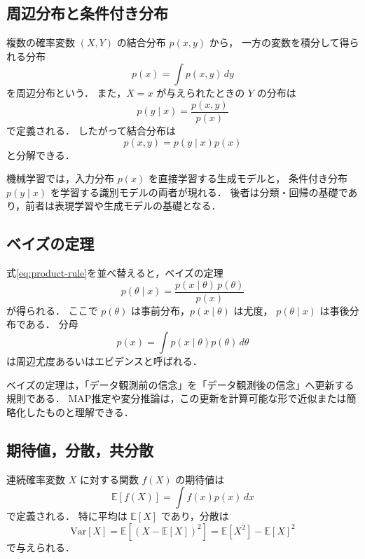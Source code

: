 \subsection{周辺分布と条件付き分布}

複数の確率変数 $(X,Y)$ の結合分布 $p(x,y)$ から，
一方の変数を積分して得られる分布
\begin{equation}
  p(x) = \int p(x,y)\,dy
  \label{eq:marginal}
\end{equation}
を周辺分布という．
また，$X=x$ が与えられたときの $Y$ の分布は
\begin{equation}
  p(y \mid x) = \frac{p(x,y)}{p(x)}
  \label{eq:conditional}
\end{equation}
で定義される．
したがって結合分布は
\begin{equation}
  p(x,y) = p(y \mid x)p(x)
  \label{eq:product-rule}
\end{equation}
と分解できる．

機械学習では，入力分布 $p(x)$ を直接学習する生成モデルと，
条件付き分布 $p(y \mid x)$ を学習する識別モデルの両者が現れる．
後者は分類・回帰の基礎であり，前者は表現学習や生成モデルの基礎となる．

\subsection{ベイズの定理}

式\eqref{eq:product-rule}を並べ替えると，ベイズの定理
\begin{equation}
  p(\theta \mid x)
  =
  \frac{p(x \mid \theta)\,p(\theta)}{p(x)}
  \label{eq:bayes-theorem}
\end{equation}
が得られる．
ここで $p(\theta)$ は事前分布，$p(x \mid \theta)$ は尤度，
$p(\theta \mid x)$ は事後分布である．
分母
\begin{equation}
  p(x) = \int p(x \mid \theta)p(\theta)\,d\theta
\end{equation}
は周辺尤度あるいはエビデンスと呼ばれる．

ベイズの定理は，「データ観測前の信念」を「データ観測後の信念」へ更新する規則である．
MAP推定や変分推論は，この更新を計算可能な形で近似または簡略化したものと理解できる．

\subsection{期待値，分散，共分散}

連続確率変数 $X$ に対する関数 $f(X)$ の期待値は
\begin{equation}
  \mathbb{E}[f(X)] = \int f(x)p(x)\,dx
  \label{eq:expectation}
\end{equation}
で定義される．
特に平均は $\mathbb{E}[X]$ であり，分散は
\begin{equation}
  \mathrm{Var}[X]
  =
  \mathbb{E}\left[(X-\mathbb{E}[X])^2\right]
  =
  \mathbb{E}[X^2] - \mathbb{E}[X]^2
  \label{eq:variance}
\end{equation}
で与えられる．

